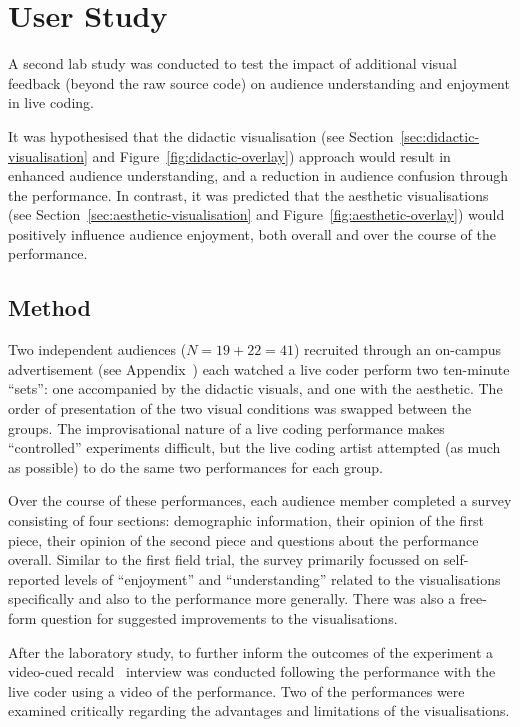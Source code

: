 
\chapter{User Study}
\label{chap:user-study}

A second lab study was conducted to test the impact of additional visual feedback (beyond the raw source code) on audience understanding and enjoyment in live coding.

It was hypothesised that the didactic visualisation (see Section~\ref{sec:didactic-visualisation} and Figure~\ref{fig:didactic-overlay}) approach would result in enhanced audience understanding, and a reduction in audience confusion through the performance. In contrast, it was predicted that the aesthetic visualisations (see Section~\ref{sec:aesthetic-visualisation} and Figure~\ref{fig:aesthetic-overlay}) would positively influence audience enjoyment, both overall and over the course of the performance. 



\section{Method}

Two independent audiences ($N=19+22=41$) recruited through an on-campus advertisement (see Appendix~) each watched a live coder perform two ten-minute ``sets'': one accompanied by the didactic visuals, and one with the aesthetic. The order of presentation of the two visual conditions was swapped between the groups. The improvisational nature of a live coding performance makes ``controlled'' experiments difficult, but the live coding artist attempted (as much as possible) to do the same two performances for each group.

Over the course of these performances, each audience member completed a survey consisting of four sections: demographic information, their opinion of the first piece, their opinion of the second piece and questions about the performance overall. Similar to the first field trial, the survey primarily focussed on self-reported levels of ``enjoyment'' and ``understanding'' related to the visualisations specifically and also to the performance more generally. There was also a free-form question for suggested improvements to the visualisations.

After the laboratory study, to further inform the outcomes of the experiment a video-cued recald~\cite{Suchman1992} interview was conducted following the performance with the live coder using a video of the performance. Two of the performances were examined critically regarding the advantages and limitations of the visualisations.

